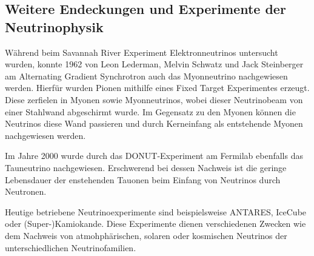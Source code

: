 \subsection{Weitere Endeckungen und Experimente der Neutrinophysik}
Während beim Savannah River Experiment Elektronneutrinos untersucht wurden, konnte 1962 von Leon Lederman, Melvin Schwatz und Jack Steinberger am Alternating Gradient Synchrotron auch das Myonneutrino nachgewiesen werden.
Hierfür wurden Pionen mithilfe eines Fixed Target Experimentes erzeugt.
Diese zerfielen in Myonen sowie Myonneutrinos, wobei dieser Neutrinobeam von einer Stahlwand abgeschirmt wurde.
Im Gegensatz zu den Myonen können die Neutrinos diese Wand passieren und durch Kerneinfang als entstehende Myonen nachgewiesen werden.

Im Jahre 2000 wurde durch das DONUT-Experiment am Fermilab ebenfalls das Tauneutrino nachgewiesen.
Erschwerend bei dessen Nachweis ist die geringe Lebensdauer der enstehenden Tauonen beim Einfang von Neutrinos durch Neutronen.

Heutige betriebene Neutrinoexperimente sind beispielsweise ANTARES, IceCube oder (Super-)Kamiokande.
Diese Experimente dienen verschiedenen Zwecken wie dem Nachweis von atmohphärischen, solaren oder kosmischen Neutrinos der unterschiedlichen Neutrinofamilien.